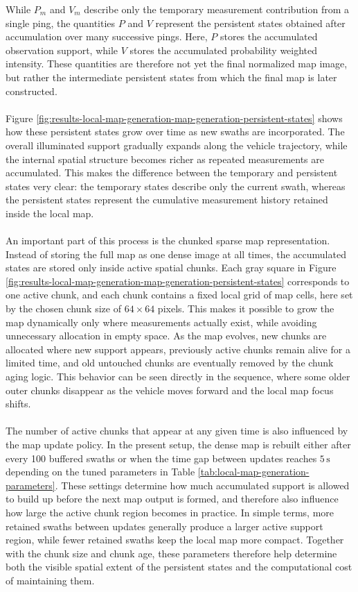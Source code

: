 \noindent
While $P_m$ and $V_m$ describe only the temporary measurement contribution from a single ping, the quantities $P$ and $V$ represent the persistent states obtained after accumulation over many successive pings. Here, $P$ stores the accumulated observation support, while $V$ stores the accumulated probability weighted intensity. These quantities are therefore not yet the final normalized map image, but rather the intermediate persistent states from which the final map is later constructed.
\\ \\
Figure \ref{fig:results-local-map-generation-map-generation-persistent-states} shows how these persistent states grow over time as new swaths are incorporated. The overall illuminated support gradually expands along the vehicle trajectory, while the internal spatial structure becomes richer as repeated measurements are accumulated. This makes the difference between the temporary and persistent states very clear: the temporary states describe only the current swath, whereas the persistent states represent the cumulative measurement history retained inside the local map.
\\ \\
An important part of this process is the chunked sparse map representation. Instead of storing the full map as one dense image at all times, the accumulated states are stored only inside active spatial chunks. Each gray square in Figure \ref{fig:results-local-map-generation-map-generation-persistent-states} corresponds to one active chunk, and each chunk contains a fixed local grid of map cells, here set by the chosen chunk size of $64 \times 64$ pixels. This makes it possible to grow the map dynamically only where measurements actually exist, while avoiding unnecessary allocation in empty space. As the map evolves, new chunks are allocated where new support appears, previously active chunks remain alive for a limited time, and old untouched chunks are eventually removed by the chunk aging logic. This behavior can be seen directly in the sequence, where some older outer chunks disappear as the vehicle moves forward and the local map focus shifts.
\\ \\
The number of active chunks that appear at any given time is also influenced by the map update policy. In the present setup, the dense map is rebuilt either after every 100 buffered swaths or when the time gap between updates reaches $5\,\mathrm{s}$ depending on the tuned parameters in Table \ref{tab:local-map-generation-parameters}. These settings determine how much accumulated support is allowed to build up before the next map output is formed, and therefore also influence how large the active chunk region becomes in practice. In simple terms, more retained swaths between updates generally produce a larger active support region, while fewer retained swaths keep the local map more compact. Together with the chunk size and chunk age, these parameters therefore help determine both the visible spatial extent of the persistent states and the computational cost of maintaining them.
